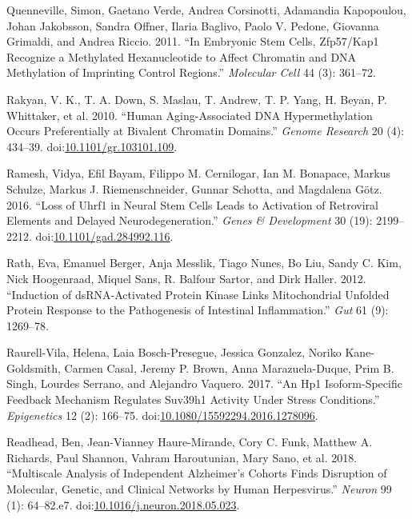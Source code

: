 \documentclass[onehalf,12pt]{beavtex}
\begin{document}
  \hypertarget{ref-Quennevilleembryonicstemcells2011}{}
  Quenneville, Simon, Gaetano Verde, Andrea Corsinotti, Adamandia
  Kapopoulou, Johan Jakobsson, Sandra Offner, Ilaria Baglivo, Paolo V.
  Pedone, Giovanna Grimaldi, and Andrea Riccio. 2011. ``In Embryonic Stem
  Cells, Zfp57/Kap1 Recognize a Methylated Hexanucleotide to Affect
  Chromatin and DNA Methylation of Imprinting Control Regions.''
  \emph{Molecular Cell} 44 (3): 361--72.
  
  \hypertarget{ref-RakyanHumanagingassociatedDNA2010}{}
  Rakyan, V. K., T. A. Down, S. Maslau, T. Andrew, T. P. Yang, H. Beyan,
  P. Whittaker, et al. 2010. ``Human Aging-Associated DNA Hypermethylation
  Occurs Preferentially at Bivalent Chromatin Domains.'' \emph{Genome
  Research} 20 (4): 434--39.
  doi:\href{https://doi.org/10.1101/gr.103101.109}{10.1101/gr.103101.109}.
  
  \hypertarget{ref-RameshLossUhrf1neural2016}{}
  Ramesh, Vidya, Efil Bayam, Filippo M. Cernilogar, Ian M. Bonapace,
  Markus Schulze, Markus J. Riemenschneider, Gunnar Schotta, and Magdalena
  Götz. 2016. ``Loss of Uhrf1 in Neural Stem Cells Leads to Activation of
  Retroviral Elements and Delayed Neurodegeneration.'' \emph{Genes \&
  Development} 30 (19): 2199--2212.
  doi:\href{https://doi.org/10.1101/gad.284992.116}{10.1101/gad.284992.116}.
  
  \hypertarget{ref-RathInductiondsRNAactivatedprotein2012}{}
  Rath, Eva, Emanuel Berger, Anja Messlik, Tiago Nunes, Bo Liu, Sandy C.
  Kim, Nick Hoogenraad, Miquel Sans, R. Balfour Sartor, and Dirk Haller.
  2012. ``Induction of dsRNA-Activated Protein Kinase Links Mitochondrial
  Unfolded Protein Response to the Pathogenesis of Intestinal
  Inflammation.'' \emph{Gut} 61 (9): 1269--78.
  
  \hypertarget{ref-Raurell-VilaHP1isoformspecificfeedback2017}{}
  Raurell-Vila, Helena, Laia Bosch-Presegue, Jessica Gonzalez, Noriko
  Kane-Goldsmith, Carmen Casal, Jeremy P. Brown, Anna Marazuela-Duque,
  Prim B. Singh, Lourdes Serrano, and Alejandro Vaquero. 2017. ``An Hp1
  Isoform-Specific Feedback Mechanism Regulates Suv39h1 Activity Under
  Stress Conditions.'' \emph{Epigenetics} 12 (2): 166--75.
  doi:\href{https://doi.org/10.1080/15592294.2016.1278096}{10.1080/15592294.2016.1278096}.
  
  \hypertarget{ref-ReadheadMultiscaleAnalysisIndependent2018}{}
  Readhead, Ben, Jean-Vianney Haure-Mirande, Cory C. Funk, Matthew A.
  Richards, Paul Shannon, Vahram Haroutunian, Mary Sano, et al. 2018.
  ``Multiscale Analysis of Independent Alzheimer's Cohorts Finds
  Disruption of Molecular, Genetic, and Clinical Networks by Human
  Herpesvirus.'' \emph{Neuron} 99 (1): 64--82.e7.
  doi:\href{https://doi.org/10.1016/j.neuron.2018.05.023}{10.1016/j.neuron.2018.05.023}.
  
\end{document}

